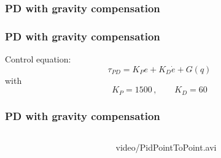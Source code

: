 \subsubsection{PD with gravity compensation}
\begin{frame}
\frametitle{PD with gravity compensation}
Control equation:
\begin{equation}
	\tau_{PD} = K_Pe + K_D\dot{e}+G(q)
\end{equation}
with
\[ K_P = 1500\,, \qquad K_D = 60\]
\end{frame}
%
\begin{frame}
\frametitle{PD with gravity compensation}
%
\begin{columns}
\begin{column}{0.4\textwidth}
\end{column}
\begin{column}{0.6\textwidth}
	\begin{center}
		{video/PidPointToPoint.avi}
	\end{center}
\end{column}
\end{columns}
\end{frame}
%
